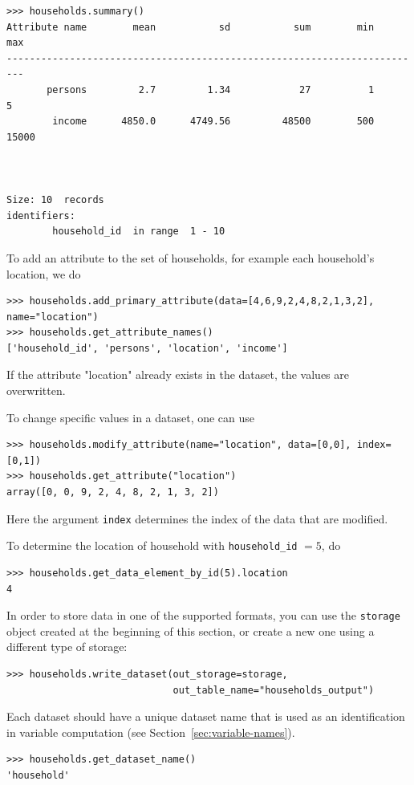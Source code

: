 \begin{verbatim}
>>> households.summary()
Attribute name        mean           sd           sum        min     max
-------------------------------------------------------------------------
       persons         2.7         1.34            27          1       5
        income      4850.0      4749.56         48500        500   15000
       


Size: 10  records
identifiers:
        household_id  in range  1 - 10
\end{verbatim}

To add an attribute to the set of households, for example each
household's location, we do
\begin{verbatim}
>>> households.add_primary_attribute(data=[4,6,9,2,4,8,2,1,3,2], name="location")
>>> households.get_attribute_names()
['household_id', 'persons', 'location', 'income']
\end{verbatim}
If the attribute "location" already exists in the dataset, the values are
overwritten.

To change specific values in a dataset, one can use


\begin{verbatim}
>>> households.modify_attribute(name="location", data=[0,0], index=[0,1])
>>> households.get_attribute("location")
array([0, 0, 9, 2, 4, 8, 2, 1, 3, 2])
\end{verbatim}
Here the argument \verb|index| determines the index of the data that are
modified.

To determine the location of household with \verb|household_id| $= 5$,
do
\begin{verbatim}
>>> households.get_data_element_by_id(5).location
4
\end{verbatim}

In order to store data in one of the supported formats,
you can use the {\tt storage} object created at the beginning of this section, or create a new one using
a different type of storage:

 
\begin{verbatim}
>>> households.write_dataset(out_storage=storage,
                             out_table_name="households_output")
\end{verbatim}

Each dataset 
  should have a unique dataset name that is used as an identification in
  variable computation (see
  Section~\ref{sec:variable-names}). 

\begin{verbatim}
>>> households.get_dataset_name()
'household'
\end{verbatim}


